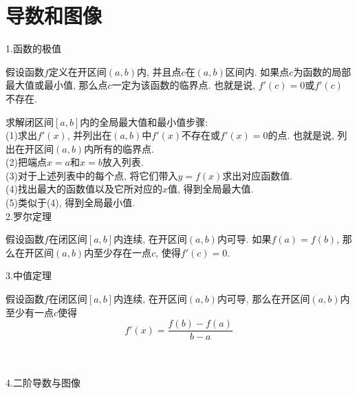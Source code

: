\chapter{导数和图像}
1.函数的极值
\begin{theorem}[极值定理]
假设函数$f$定义在开区间$(a,b)$内, 并且点$c$在$(a,b)$区间内. 如果点$c$为函数的局部最大值或最小值, 那么点$c$一定为该函数的临界点. 也就是说, $f'(c)=0$或$f'(c)$不存在.
\end{theorem}
求解闭区间$[a,b]$内的全局最大值和最小值步骤:\\
(1)求出$f'(x)$, 并列出在$(a,b)$中$f'(x)$不存在或$f'(x)=0$的点. 也就是说, 列出在开区间$(a,b)$内所有的临界点.\\
(2)把端点$x=a$和$x=b$放入列表.\\
(3)对于上述列表中的每个点, 将它们带入$y=f(x)$求出对应函数值.\\
(4)找出最大的函数值以及它所对应的$x$值, 得到全局最大值.\\
(5)类似于(4), 得到全局最小值.\\[2ex]

2.罗尔定理
\begin{theorem}[罗尔定理]
假设函数$f$在闭区间$[a,b]$内连续, 在开区间$(a,b)$内可导. 如果$f(a)=f(b)$, 那么在开区间$(a,b)$内至少存在一点$c$, 使得$f'(c)=0$.
\end{theorem}\vspace{4ex}

3.中值定理
\begin{theorem}[中值定理]
假设函数$f$在闭区间$[a,b]$内连续, 在开区间$(a,b)$内可导, 那么在开区间$(a,b)$内至少有一点$c$使得
\[f'(x)=\frac{f(b)-f(a)}{b-a}\]
\end{theorem}
\\[2ex]
\\[4ex]

4.二阶导数与图像
{\par\raggedright
{}\\[2ex]
\par}\vspace{4ex}


